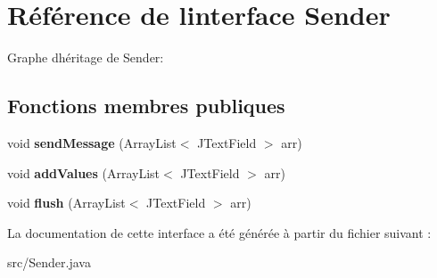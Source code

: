 \hypertarget{interfaceSender}{}\section{Référence de l\textquotesingle{}interface Sender}
\label{interfaceSender}


Graphe d\textquotesingle{}héritage de Sender\+:
\subsection*{Fonctions membres publiques}
\begin{DoxyCompactItemize}
\item 
\mbox{\label{interfaceSender_ad7d5096e04f19d66e1ba4008119ee9a8}} 
void {\bfseries send\+Message} (Array\+List$<$ J\+Text\+Field $>$ arr)
\item 
\mbox{\label{interfaceSender_af23196bcbee04014d863d1e82e82287c}} 
void {\bfseries add\+Values} (Array\+List$<$ J\+Text\+Field $>$ arr)
\item 
\mbox{\label{interfaceSender_a7e45ebae601855fa572d8fbb9628af39}} 
void {\bfseries flush} (Array\+List$<$ J\+Text\+Field $>$ arr)
\end{DoxyCompactItemize}


La documentation de cette interface a été générée à partir du fichier suivant \+:\begin{DoxyCompactItemize}
\item 
src/Sender.\+java\end{DoxyCompactItemize}
